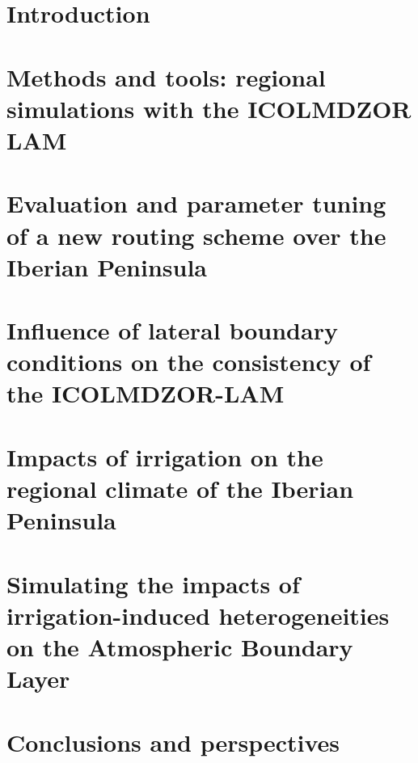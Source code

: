 \documentclass{report}
\begin{document}
\clearpage
\dominitoc
\renewcommand*\contentsname{Contents}
\tableofcontents
\newpage

\chapter{Introduction}
\label{chap:introduction}
\minitoc
\pagebreak


\chapter{Methods and tools: regional simulations with the ICOLMDZOR LAM}
\label{chap:methods}
\minitoc
\pagebreak


\chapter{Evaluation and parameter tuning of a new routing scheme over the Iberian Peninsula}
\label{chap:routing}
\minitoc
\pagebreak


\chapter{Influence of lateral boundary conditions on the consistency of the ICOLMDZOR-LAM}
\label{chap:forcing}
\minitoc
\pagebreak


\chapter{Impacts of irrigation on the regional climate of the Iberian Peninsula}
\label{chap:monthly}
\minitoc
\pagebreak


\chapter{Simulating the impacts of irrigation-induced heterogeneities on the Atmospheric Boundary Layer}
\label{chap:liaise}
\minitoc
\pagebreak


\chapter{Conclusions and perspectives}




\newpage

\printbibliography

\end{document}
